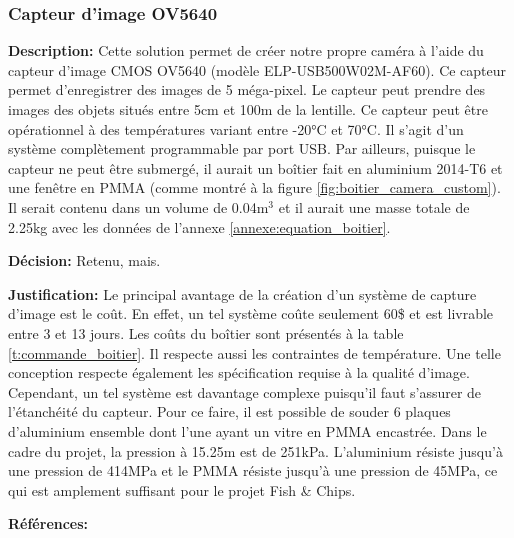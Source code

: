 \subsubsection{Capteur d'image OV5640}
\label{subsubsection:camera_custom}

\textbf{Description:} Cette solution permet de créer notre propre caméra à l'aide du capteur d'image CMOS OV5640 (modèle ELP-USB500W02M-AF60). Ce capteur permet d'enregistrer des images de 5 méga-pixel. Le capteur peut prendre des images des objets situés entre 5cm et 100m de la lentille. Ce capteur peut être opérationnel à des températures variant entre -20°C et 70°C. Il s'agit d'un système complètement programmable par port USB. Par ailleurs, puisque le capteur ne peut être submergé, il aurait un boîtier fait en aluminium 2014-T6 et une fenêtre en PMMA (comme montré à la figure \ref{fig:boitier_camera_custom}). Il serait contenu dans un volume de 0.04m$^3$ et il aurait une masse totale de 2.25kg avec les données de l'annexe \ref{annexe:equation_boitier}.

\textbf{Décision:} Retenu, mais.

\textbf{Justification:} Le principal avantage de la création d'un système de capture d'image est le coût. En effet, un tel système coûte seulement 60\$ et est livrable entre 3 et 13 jours. Les coûts du boîtier sont présentés à la table \ref{t:commande_boitier}. Il respecte aussi les contraintes de température. Une telle conception respecte également les spécification requise à la qualité d'image. Cependant, un tel système est davantage complexe puisqu'il faut s'assurer de l'étanchéité du capteur. Pour ce faire, il est possible de souder 6 plaques d'aluminium ensemble dont l'une ayant un vitre en PMMA encastrée. Dans le cadre du projet, la pression à 15.25m est de 251kPa. L'aluminium résiste jusqu'à une pression de 414MPa et le PMMA résiste jusqu'à une pression de 45MPa, ce qui est amplement suffisant pour le projet Fish \& Chips.

\textbf{Références:} \cite{OV5640} \cite{OV5640_coûts} \cite{ASM} \cite{Glass}

\begin{table}[!htb]
\footnotesize
\centering
{}
\caption{Faisabilité des concepts pour capter les informations sur les poissons}
\label{t:Decision_capteur}
\end{table}


